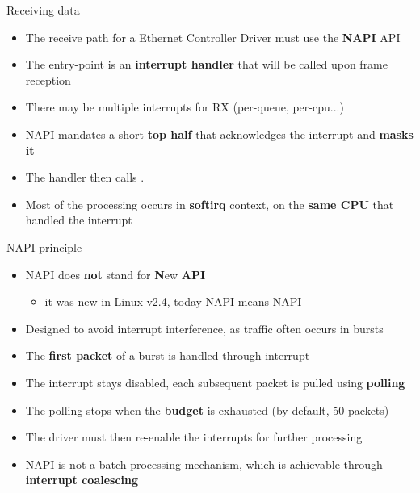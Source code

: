 \begin{frame}{Receiving data}
	\begin{itemize}
		\item The receive path for a Ethernet Controller Driver must use the \textbf{NAPI} API
		\item The entry-point is an \textbf{interrupt handler} that will be called upon frame reception
		\item There may be multiple interrupts for RX (per-queue, per-cpu...)
		\item NAPI mandates a short \textbf{top half} that acknowledges the interrupt and \textbf{masks it}
		\item The handler then calls .
		\item Most of the processing occurs in \textbf{softirq} context, on the \textbf{same CPU} that handled the interrupt
	\end{itemize}
\end{frame}

\begin{frame}{NAPI principle}
	\begin{itemize}
		\item NAPI does \textbf{not} stand for \textbf{N}ew \textbf{API}
			\begin{itemize}
				\item it was new in Linux v2.4, today NAPI means NAPI
			\end{itemize}
		\item Designed to avoid interrupt interference, as traffic often occurs in bursts
		\item The \textbf{first packet} of a burst is handled through interrupt
		\item The interrupt stays disabled, each subsequent packet is pulled using \textbf{polling}
		\item The polling stops when the \textbf{budget} is exhausted (by default, 50 packets)
		\item The driver must then re-enable the interrupts for further processing
		\item NAPI is not a batch processing mechanism, which is achievable through \textbf{interrupt coalescing}
	\end{itemize}
\end{frame}

